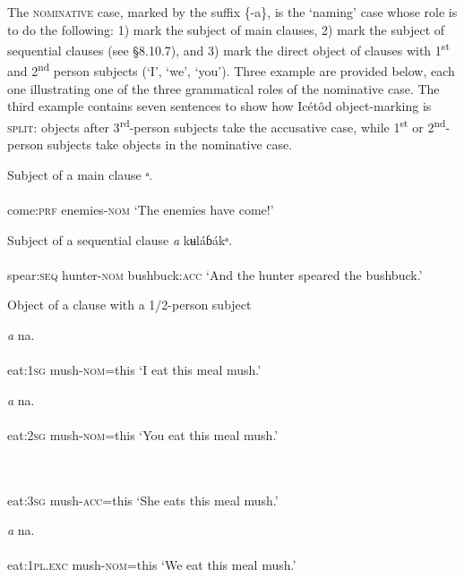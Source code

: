 The \textsc{nominative} case, marked by the suffix \{-a\}, is the ‘naming’ case whose role is to do the following: 1) mark the subject of main clauses, 2) mark the subject of sequential clauses (see §8.10.7), and 3) mark the direct object of clauses with 1\textsuperscript{st} and 2\textsuperscript{nd} person subjects (‘I’, ‘we’, ‘you’). Three example are provided below, each one illustrating one of the three grammatical roles of the nominative case. The third example contains seven sentences to show how Icétôd object-marking is \textsc{split}: objects after 3\textsuperscript{rd}{}-person subjects take the accusative case, while 1\textsuperscript{st} or 2\textsuperscript{nd}{}-person subjects take objects in the nominative case.




Subject of a main clause
\ea\label{ex:}
ᵃ. \\
    \\
come:\textsc{prf}   enemies-\textsc{nom}
\glt ‘The enemies have come!’ 
\z




Subject of a sequential clause
\ea\label{ex:}
\textit{a}   kʉláɓákᵃ. \\
    \\
spear:\textsc{seq}   hunter-\textsc{nom}   bushbuck:\textsc{acc}
\glt ‘And the hunter speared the bushbuck.’ 
\z




Object of a clause with a 1/2-person subject




\ea\label{ex:}
\textit{a} na. \\
    \\
eat:\textsc{1sg}   mush-\textsc{nom}=this
\glt ‘I eat this meal mush.’ 
\z




\ea\label{ex:}
\textit{a} na. \\
    \\
eat:\textsc{2sg}   mush-\textsc{nom}=this
\glt ‘You eat this meal mush.’ 
\z




\ea\label{ex:}
 \\
    \\
eat:\textsc{3sg}   mush-\textsc{acc}=this
\glt ‘She eats this meal mush.’ 
\z




\ea\label{ex:}
\textit{a} na. \\
    \\
eat:\textsc{1pl.exc}   mush-\textsc{nom}=this
\glt ‘We eat this meal mush.’ 
\z




